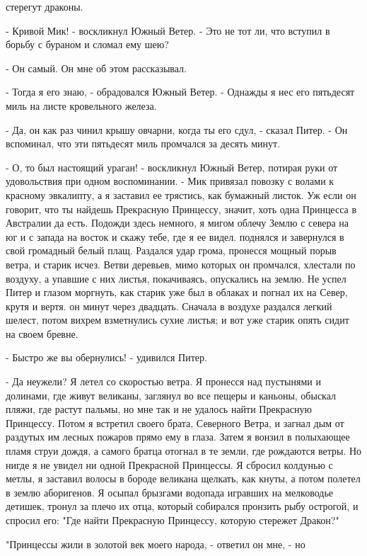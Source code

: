 стерегут драконы.
\par- Кривой Мик! - воскликнул Южный Ветер. - Это не тот ли, что 
вступил в борьбу с бураном и сломал ему шею?
\par- Он самый. Он мне об этом рассказывал.
\par- Тогда я его знаю, - обрадовался Южный Ветер. - Однажды я нес его 
пятьдесят миль на листе кровельного железа.
\par- Да, он как раз чинил крышу овчарни, когда ты его сдул, - сказал 
Питер. - Он вспоминал, что эти пятьдесят миль промчался за десять 
минут.
\par- О, то был настоящий ураган! - воскликнул Южный Ветер, потирая 
руки от удовольствия при одном воспоминании. - Мик привязал повозку с 
волами к красному эвкалипту, а я заставил ее трястись, как бумажный 
листок. Уж если он говорит, что ты найдешь Прекрасную Принцессу, 
значит, хоть одна Принцесса в Австралии да есть. Подожди здесь 
немного, я мигом облечу Землю с севера на юг и с запада на восток и 
скажу тебе, где я ее видел.
 поднялся и завернулся в свой громадный белый плащ. Раздался 
удар грома, пронесся мощный порыв ветра, и старик исчез. Ветви 
деревьев, мимо которых он промчался, хлестали по воздуху, а упавшие с 
них листья, покачиваясь, опускались на землю. Не успел Питер и глазом 
моргнуть, как старик уже был в облаках и погнал их на Север, крутя и 
вертя.
 он минут через двадцать. Сначала в воздухе раздался 
легкий шелест, потом вихрем взметнулись сухие листья; и вот уже старик 
опять сидит на своем бревне.
\par- Быстро же вы обернулись! - удивился Питер.
\par- Да неужели? Я летел со скоростью ветра. Я пронесся над пустынями 
и долинами, где живут великаны, заглянул во все пещеры и каньоны, 
обыскал пляжи, где растут пальмы, но мне так и не удалось найти 
Прекрасную Принцессу. Потом я встретил своего брата, Северного Ветра, 
и загнал дым от раздутых им лесных пожаров прямо ему в глаза. Затем я 
вонзил в полыхающее пламя струи дождя, а самого братца отогнал в те 
земли, где рождаются ветры. Но нигде я не увидел ни одной Прекрасной 
Принцессы. Я сбросил колдунью с метлы, я заставил волосы в бороде 
великана щелкать, как кнуты, а потом полетел в землю аборигенов. Я 
осыпал брызгами водопада игравших на мелководье детишек, тронул за 
плечо их отца, который собирался пронзить рыбу острогой, и спросил 
его: "Где найти Прекрасную Принцессу, которую стережет Дракон?"
\par"Принцессы жили в золотой век моего народа, - ответил он мне, - но 
